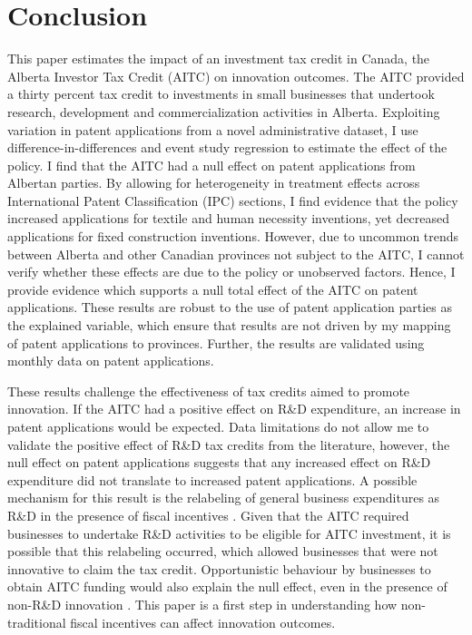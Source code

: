 \documentclass[../main.tex]{subfiles}
\begin{document}
\section{Conclusion}
\label{sec:conclusions}

This paper estimates the impact of an investment tax credit in Canada, the Alberta Investor Tax Credit (AITC) on innovation outcomes. The AITC provided a thirty percent tax credit to investments in small businesses that undertook research, development and commercialization activities in Alberta. Exploiting variation in patent applications from a novel administrative dataset, I use difference-in-differences and event study regression to estimate the effect of the policy. I find that the AITC had a null effect on patent applications from Albertan parties. By allowing for heterogeneity in treatment effects across International Patent Classification (IPC) sections, I find evidence that the policy increased applications for textile and human necessity inventions, yet decreased applications for fixed construction inventions. However, due to uncommon trends between Alberta and other Canadian provinces not subject to the AITC, I cannot verify whether these effects are due to the policy or unobserved factors. Hence, I provide evidence which supports a null total effect of the AITC on patent applications. These results are robust to the use of patent application parties as the explained variable, which ensure that results are not driven by my mapping of patent applications to provinces. Further, the results are validated using monthly data on patent applications. 

These results challenge the effectiveness of tax credits aimed to promote innovation. If the AITC had a positive effect on R\&D expenditure, an increase in patent applications would be expected. Data limitations do not allow me to validate the positive effect of R\&D tax credits from the literature, however, the null effect on patent applications suggests that any increased effect on R\&D expenditure did not translate to increased patent applications. A possible mechanism for this result is the relabeling of general business expenditures as R\&D in the presence of fiscal incentives \parencite{chen_etal21}. Given that the AITC required businesses to undertake R\&D activities to be eligible for AITC investment, it is possible that this relabeling occurred, which allowed businesses that were not innovative to claim the tax credit. Opportunistic behaviour by businesses to obtain AITC funding would also explain the null effect, even in the presence of non-R\&D innovation \parencite{xie_etal19}. This paper is a first step in understanding how non-traditional fiscal incentives can affect innovation outcomes. 
\end{document}
